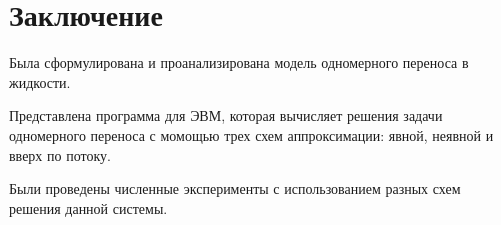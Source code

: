 \chapter{Заключение}
Была сформулирована и проанализирована модель одномерного переноса в жидкости.

Представлена программа для ЭВМ, которая вычисляет решения задачи одномерного переноса с момощью трех схем аппроксимации: явной, неявной и вверх по потоку.

Были проведены численные эксперименты с использованием разных схем решения данной системы.